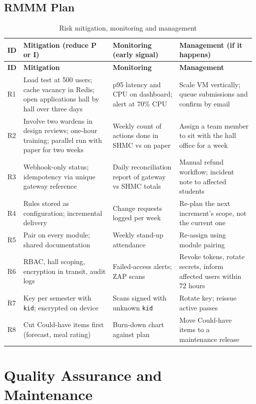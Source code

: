 \documentclass[11pt,a4paper]{report}
\begin{document}
\section{RMMM Plan}
{\footnotesize
\begin{longtable}{p{0.8cm}p{4.6cm}p{4.3cm}p{4.3cm}}
\caption{Risk mitigation, monitoring and management}\label{tab:rmmm}\\
\toprule
\textbf{ID} & \textbf{Mitigation (reduce P or I)} & \textbf{Monitoring (early signal)} & \textbf{Management (if it happens)}\\
\midrule\endfirsthead
\toprule
\textbf{ID} & \textbf{Mitigation} & \textbf{Monitoring} & \textbf{Management}\\
\midrule\endhead
R1 & Load test at 500 users; cache vacancy in Redis; open applications hall by hall over three days & p95 latency and CPU on dashboard; alert at 70\% CPU & Scale VM vertically; queue submissions and confirm by email\\
R2 & Involve two wardens in design reviews; one-hour training; parallel run with paper for two weeks & Weekly count of actions done in SHMC vs on paper & Assign a team member to sit with the hall office for a week\\
R3 & Webhook-only status; idempotency via unique gateway reference & Daily reconciliation report of gateway vs SHMC totals & Manual refund workflow; incident note to affected students\\
R4 & Rules stored as configuration; incremental delivery & Change requests logged per week & Re-plan the next increment's scope, not the current one\\
R5 & Pair on every module; shared documentation & Weekly stand-up attendance & Re-assign using module pairing\\
R6 & RBAC, hall scoping, encryption in transit, audit logs & Failed-access alerts; ZAP scans & Revoke tokens, rotate secrets, inform affected users within 72 hours\\
R7 & Key per semester with \texttt{kid}; encrypted on device & Scans signed with unknown \texttt{kid} & Rotate key; reissue active passes\\
R8 & Cut Could-have items first (forecast, meal rating) & Burn-down chart against plan & Move Could-have items to a maintenance release\\
\bottomrule
\end{longtable}}

\chapter{Quality Assurance and Maintenance}
\end{document}
